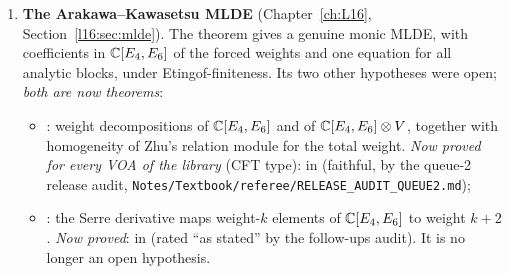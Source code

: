 \begin{enumerate}
\begin{itemize}
    () is proved for $m\le2$;
  \item $G_2$, $F_4$, $E_6$, $E_7$, $E_8$:  ($\le(\dim\mathfrak g)^m$), the Demazure
    realizations, and the star bound (, , , ,
    ), checked numerically to orders $q^{60}$, $q^{25}$, $q^{20}$, $q^{16}$, $q^{14}$ respectively (scoping pass of
    28~October~2026, Chapter~\ref{ch:L27}, Section~\ref{l27:sec:starinput}).
  \end{itemize}
  The inputs that remain open in Lean (Chapter~\ref{ch:L27}, Section~\ref{l27:sec:cores}) are the total-dimension bound and
  the graded Demazure realizations beyond $A_2$ and $D_4$, both published theorems not yet formalized (the former with a proof step
  flagged by the project), and the star identities for $G_2$, $F_4$ and the $E$-types, which are conjectures with numerical
  evidence. For $G_2$ the library splits the identity into , which follows from published results
  (Fourier--Littelmann, Chari--Moura, Ardonne--Kedem, Di Francesco--Kedem; Chapter~\ref{ch:L27},
  Section~\ref{l27:sec:starinput}), and , a $q$-series identity that is open (checked through $q^{60}$).
\item \textbf{The Arakawa--Kawasetsu MLDE} (Chapter~\ref{ch:L16}, Section~\ref{l16:sec:mlde}). The theorem
   gives a genuine monic MLDE, with
  coefficients in ${\mathbb{C}}[E_4,E_6]$ of the forced weights and one equation for all analytic blocks, under Etingof-finiteness.
  Its two other hypotheses were open; \emph{both are now theorems}:
  \begin{itemize}
  \item {}: weight decompositions of ${\mathbb{C}}[E_4,E_6]$ and of ${\mathbb{C}}[E_4,E_6]\otimes V$, together with
    homogeneity of Zhu's relation module for the total weight. \emph{Now proved for every VOA of the library} (CFT type):
     in  (faithful, by the queue-2 release audit,
    \texttt{Notes/Textbook/referee/RELEASE\_AUDIT\_QUEUE2.md});
  \item {}: the Serre derivative maps weight-$k$ elements of ${\mathbb{C}}[E_4,E_6]$ to weight $k+2$.
    \emph{Now proved}:  in  (rated ``as
    stated'' by the follow-ups audit). It is no longer an open hypothesis.

\end{itemize}
\end{enumerate}
